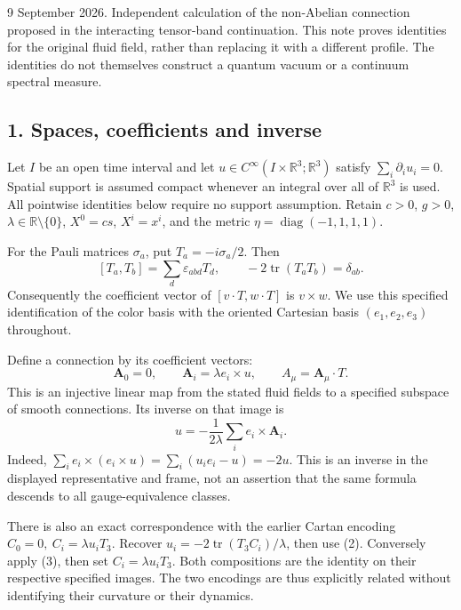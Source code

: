 \documentclass[
  11pt,
]{article}
\begin{document}
9 September 2026. Independent calculation of the non-Abelian connection
proposed in the interacting tensor-band continuation. This note proves
identities for the original fluid field, rather than replacing it with a
different profile. The identities do not themselves construct a quantum
vacuum or a continuum spectral measure.

\subsection{1. Spaces, coefficients and
inverse}\label{weak-coupling-part-18-spaces-coefficients-and-inverse}

Let \(I\) be an open time interval and let
\(u\in C^\infty(I\times\mathbb R^3;\mathbb R^3)\) satisfy
\(\sum_i\partial_i u_i=0\). Spatial support is assumed compact whenever
an integral over all of \(\mathbb R^3\) is used. All pointwise
identities below require no support assumption. Retain \(c>0\), \(g>0\),
\(\lambda\in\mathbb R\setminus\{0\}\), \(X^0=cs\), \(X^i=x^i\), and the
metric \(\eta=\operatorname{diag}(-1,1,1,1)\).

For the Pauli matrices \(\sigma_a\), put \(T_a=-i\sigma_a/2\). Then \[
 [T_a,T_b]=\sum_d\varepsilon_{abd}T_d,\qquad
 -2\operatorname{tr}(T_aT_b)=\delta_{ab}.
 \tag{1}
\] Consequently the coefficient vector of \([v\cdot T,w\cdot T]\) is
\(v\times w\). We use this specified identification of the color basis
with the oriented Cartesian basis \((e_1,e_2,e_3)\) throughout.

Define a connection by its coefficient vectors: \[
 \mathbf A_0=0,\qquad
 \mathbf A_i=\lambda e_i\times u,\qquad
 A_\mu=\mathbf A_\mu\cdot T.
 \tag{2}
\] This is an injective linear map from the stated fluid fields to a
specified subspace of smooth connections. Its inverse on that image is
\[
 u=-\frac1{2\lambda}\sum_i e_i\times\mathbf A_i.
 \tag{3}
\] Indeed, \(\sum_i e_i\times(e_i\times u)=\sum_i(u_i e_i-u)=-2u\). This
is an inverse in the displayed representative and frame, not an
assertion that the same formula descends to all gauge-equivalence
classes.

There is also an exact correspondence with the earlier Cartan encoding
\(C_0=0,\ C_i=\lambda u_iT_3\). Recover
\(u_i=-2\operatorname{tr}(T_3C_i)/\lambda\), then use (2). Conversely
apply (3), then set \(C_i=\lambda u_iT_3\). Both compositions are the
identity on their respective specified images. The two encodings are
thus explicitly related without identifying their curvature or their
dynamics.
\end{document}
